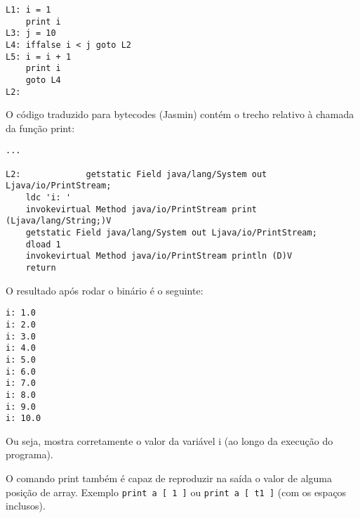 \begin{lstlisting}[caption=Código intermediário com adição do comando print.]
L1:	i = 1
    print i
L3:	j = 10
L4:	iffalse i < j goto L2
L5:	i = i + 1
    print i
    goto L4
L2: 
\end{lstlisting}

O código traduzido para bytecodes (Jasmin) contém o trecho relativo à chamada da função print:

\begin{lstlisting}[caption=Trecho do código traduzido.]
...

L2: 			getstatic Field java/lang/System out Ljava/io/PrintStream;
	ldc 'i: '
	invokevirtual Method java/io/PrintStream print (Ljava/lang/String;)V
	getstatic Field java/lang/System out Ljava/io/PrintStream;
	dload 1
	invokevirtual Method java/io/PrintStream println (D)V
	return
\end{lstlisting}

O resultado após rodar o binário é o seguinte:

\begin{lstlisting}
i: 1.0
i: 2.0
i: 3.0
i: 4.0
i: 5.0
i: 6.0
i: 7.0
i: 8.0
i: 9.0
i: 10.0
\end{lstlisting}
Ou seja, mostra corretamente o valor da variável i (ao longo da execução do programa). 
	
O comando print também é capaz de reproduzir na saída o valor de alguma posição de array. Exemplo \texttt{print a [ 1 ]} ou \texttt{print a [ t1 ]} (com os espaços inclusos).